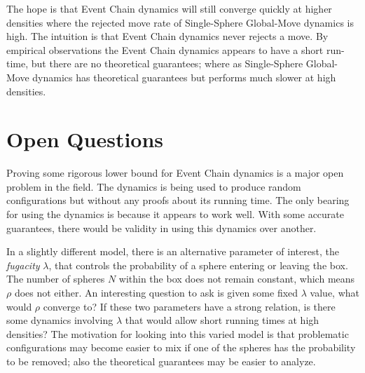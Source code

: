 \documentclass[a4paper,11pt]{article}
\begin{document}
The hope is that Event Chain dynamics will still converge quickly at higher densities where the rejected move rate of Single-Sphere Global-Move dynamics is high.  The intuition is that Event Chain dynamics never rejects a move.  By empirical observations the Event Chain dynamics appears to have a short run-time, but there are no theoretical guarantees; where as Single-Sphere Global-Move dynamics has theoretical guarantees but performs much slower at high densities.

\section*{Open Questions}

Proving some rigorous lower bound for Event Chain dynamics is a major open problem in the field.  The dynamics is being used to produce random configurations but without any proofs about its running time.  The only bearing for using the dynamics is because it appears to work well.  With some accurate guarantees, there would be validity in using this dynamics over another.

In a slightly different model, there is an alternative parameter of interest, the \textit{fugacity} $\lambda$, that controls the probability of a sphere entering or leaving the box. The number of spheres $N$ within the box does not remain constant, which means $\rho$ does not either.  An interesting question to ask is given some fixed $\lambda$ value, what would $\rho$ converge to?  If these two parameters have a strong relation, is there some dynamics involving $\lambda$ that would allow short running times at high densities?  The motivation for looking into this varied model is that problematic configurations may become easier to mix if one of the spheres has the probability to be removed; also the theoretical guarantees may be easier to analyze.
\end{document}
